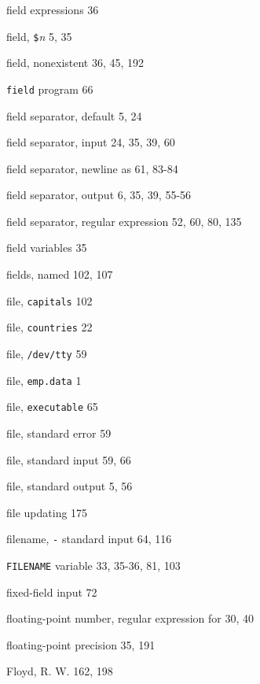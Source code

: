\begin{multicols}{3}
\hangindent=4pc  field expressions 36

\hangindent=4pc  field, \verb'$'\textit{n} 5, 35

\hangindent=4pc  field, nonexistent 36, 45, 192

\hangindent=4pc  \verb'field' program 66

\hangindent=4pc  field separator, default 5, 24

\hangindent=4pc  field separator, input 24, 35, 39, 60

\hangindent=4pc  field separator, newline as 61, 83-84

\hangindent=4pc  field separator, output 6, 35, 39, 55-56

\hangindent=4pc  field separator, regular expression 52, 60, 80, 135

\hangindent=4pc  field variables 35

\hangindent=4pc  fields, named 102, 107

\hangindent=4pc  file, \verb'capitals' 102

\hangindent=4pc  file, \verb'countries' 22

\hangindent=4pc  file, \verb'/dev/tty' 59

\hangindent=4pc  file, \verb'emp.data' 1

\hangindent=4pc  file, \verb'executable' 65

\hangindent=4pc  file, standard error 59

\hangindent=4pc  file, standard input 59, 66

\hangindent=4pc  file, standard output 5, 56

\hangindent=4pc  file updating 175

\hangindent=4pc  filename, \verb'-' standard input 64, 116

\hangindent=4pc  \verb'FILENAME' variable 33, 35-36, 81, 103

\hangindent=4pc  fixed-field input 72

\hangindent=4pc  floating-point number, regular expression for 30, 40

\hangindent=4pc  floating-point precision 35, 191

\hangindent=4pc  Floyd, R. W. 162, 198


\end{multicols}
